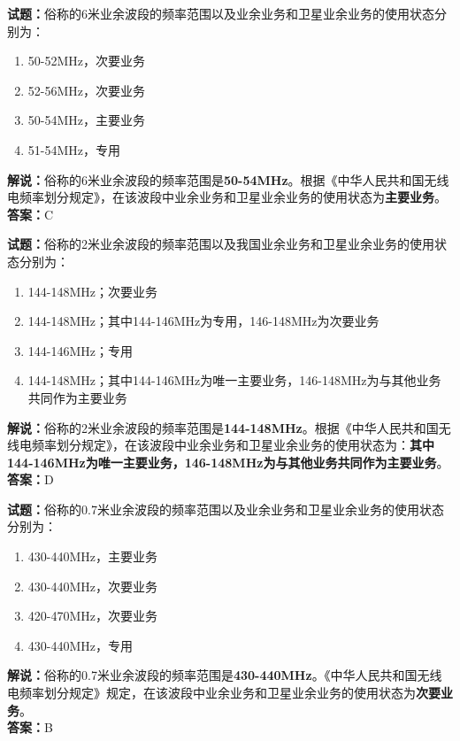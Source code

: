 \documentclass{ctexbook}
\begin{document}
\bigskip

\noindent\textbf{试题：}俗称的6米业余波段的频率范围以及业余业务和卫星业余业务的使用状态分别为：
\begin{enumerate}[leftmargin=3em]
  \item 50-52\unit{\MHz}，次要业务
  \item 52-56\unit{\MHz}，次要业务
  \item 50-54\unit{\MHz}，主要业务
  \item 51-54\unit{\MHz}，专用
\end{enumerate}
\noindent\textbf{解说：}俗称的6米业余波段的频率范围是\textbf{50-54\unit{\MHz}}。根据《中华人民共和国无线电频率划分规定》，在该波段中业余业务和卫星业余业务的使用状态为\textbf{主要业务}。\\\noindent\textbf{答案：}C

\bigskip

\noindent\textbf{试题：}俗称的2米业余波段的频率范围以及我国业余业务和卫星业余业务的使用状态分别为：
\begin{enumerate}[leftmargin=3em]
  \item 144-148\unit{\MHz}；次要业务
  \item 144-148\unit{\MHz}；其中144-146\unit{\MHz}为专用，146-148\unit{\MHz}为次要业务
  \item 144-146\unit{\MHz}；专用
  \item 144-148\unit{\MHz}；其中144-146\unit{\MHz}为唯一主要业务，146-148\unit{\MHz}为与其他业务共同作为主要业务
\end{enumerate}
\noindent\textbf{解说：}俗称的2米业余波段的频率范围是\textbf{144-148\unit{\MHz}}。根据《中华人民共和国无线电频率划分规定》，在该波段中业余业务和卫星业余业务的使用状态为：\textbf{其中144-146\unit{\MHz}为唯一主要业务，146-148\unit{\MHz}为与其他业务共同作为主要业务}。\\\noindent\textbf{答案：}D
\bigskip

\noindent\textbf{试题：}俗称的0.7米业余波段的频率范围以及业余业务和卫星业余业务的使用状态分别为：
\begin{enumerate}[leftmargin=3em]
  \item 430-440\unit{\MHz}，主要业务
  \item 430-440\unit{\MHz}，次要业务
  \item 420-470\unit{\MHz}，次要业务
  \item 430-440\unit{\MHz}，专用
\end{enumerate}
\noindent\textbf{解说：}俗称的0.7米业余波段的频率范围是\textbf{430-440\unit{\MHz}}。《中华人民共和国无线电频率划分规定》规定，在该波段中业余业务和卫星业余业务的使用状态为\textbf{次要业务}。\\\noindent\textbf{答案：}B
\bigskip
\end{document}
